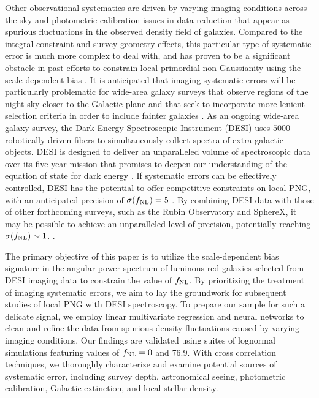 Other observational systematics are driven by varying imaging conditions across the sky \citep{ross2011} and photometric calibration issues in data reduction \citep{huterer2013calibration} that appear as spurious fluctuations in the observed density field of galaxies. Compared to the integral constraint and survey geometry effects, this particular type of systematic error is much more complex to deal with, and has proven to be a significant obstacle in past efforts to constrain local primordial non-Gaussianity using the scale-dependent bias \citep[see, e.g.,][]{pullen2013systematic, Ho2015JCAP...05..040H}. It is anticipated that imaging systematic errors will be particularly problematic for wide-area galaxy surveys that observe regions of the night sky closer to the Galactic plane and that seek to incorporate more lenient selection criteria in order to include fainter galaxies \citep[see, e.g,][]{kitanidis2020imaging}. As an ongoing wide-area galaxy survey, the Dark Energy Spectroscopic Instrument (DESI) uses $5000$ robotically-driven fibers to simultaneously collect spectra of extra-galactic objects. DESI is designed to deliver an unparalleled volume of spectroscopic data over its five year mission that promises to deepen our understanding of the equation of state for dark energy \citep{aghamousa2016desi}. If systematic errors can be effectively controlled, DESI has the potential to offer competitive constraints on local PNG, with an anticipated precision of $\sigma(f_{\rm NL})=5$ \citep{aghamousa2016desi}. By combining DESI data with those of other forthcoming surveys, such as the Rubin Observatory and SphereX, it may be possible to achieve an unparalleled level of precision, potentially reaching $\sigma (f_{\rm NL}) \sim 1$. \citep[see, e.g.,][]{Heinrich2022AAS...24020203H}.
 
The primary objective of this paper is to utilize the scale-dependent bias signature in the angular power spectrum of luminous red galaxies selected from DESI imaging data to constrain the value of $f_{\rm NL}$. By prioritizing the treatment of imaging systematic errors, we aim to lay the groundwork for subsequent studies of local PNG with DESI spectroscopy. To prepare our sample for such a delicate signal, we employ linear multivariate regression and neural networks to clean and refine the data from spurious density fluctuations caused by varying imaging conditions. Our findings are validated using suites of lognormal simulations featuring values of $f_{\rm NL}=0$ and $76.9$. With cross correlation techniques, we thoroughly characterize and examine potential sources of systematic error, including survey depth, astronomical seeing, photometric calibration, Galactic extinction, and local stellar density.

